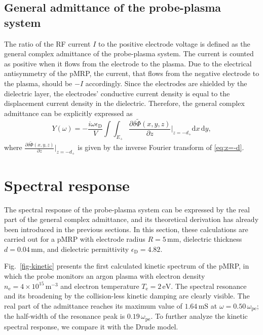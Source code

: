 \documentclass[superscriptaddress,preprint]{revtex4}  %
\begin{document}
\subsection{General admittance of the probe-plasma system}
The ratio of the RF current $I$ to the positive electrode voltage is defined as the general complex admittance of the probe-plasma system. The current is counted as positive when it flows from the electrode to the plasma. Due to the electrical antisymmetry of the pMRP, the current, that flows from the negative electrode to the plasma, should be $-I$ accordingly. Since the electrodes are shielded by the dielectric layer, the electrodes' conductive current density is equal to the displacement current density in the dielectric. Therefore, the general complex admittance can be explicitly expressed as 
\begin{equation}
Y(\omega)=-\frac{i \omega \epsilon_\mathrm{D}}{V}\int\!\!\!\!\int_{E_+} \frac{\partial{\delta\tilde{\Phi}(x,y,z)}}{\partial z} \bigg|_{z=-d_+} \mathrm{d}x \,\mathrm{d}y,
\end{equation}
where $\displaystyle{\frac{\partial{\delta\tilde{\Phi}(x,y,z)}}{\partial z}\bigg|_{z=-d_+}}$ is given by the inverse Fourier transform of \eqref{eq:z=-d}.

\pagebreak



\section{Spectral response}
The spectral response of the probe-plasma system can be expressed by the real part of the general complex admittance, and its theoretical derivation has already been introduced in the previous sections. In this section, these calculations are carried out for a pMRP with electrode radius $R=5\,\mathrm{mm}$, dielectric thickness $d=0.04 \,\mathrm{mm}$, and dielectric permittivity $\epsilon_\mathrm{D}=4.82$. 

Fig.~\ref{fig-kinetic} presents the first calculated kinetic spectrum of the pMRP, in which the probe monitors an argon plasma with electron density $n_\mathrm{e}=4\times10^{15} \,\mathrm{m}^{-3}$ and electron temperature $T_\mathrm{e}=2\,\mathrm{eV}$. The spectral resonance and its broadening by the collision-less kinetic damping are clearly visible. The real part of the admittance reaches its maximum value of $1.64\, \mathrm{mS}$ at $\omega=0.50\,\omega_\mathrm{pe}$; the half-width of the resonance peak is $0.19\,\omega_\mathrm{pe}$. To further analyze the kinetic spectral response, we compare it with the Drude model.
\end{document}
